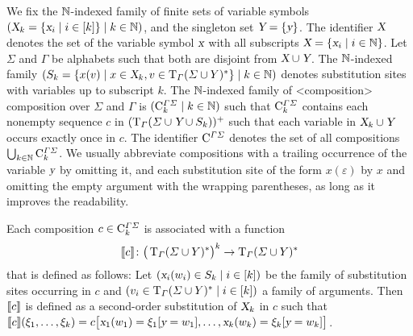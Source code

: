 \documentclass[../../document.tex]{subfiles}
\begin{document}
    \begin{definition}[Composition]
        We fix the \(\mathbb{N}\)-indexed family of finite sets of variable symbols \((\textsl{X}_k = \{\textsl{x}_i \mid i \in [k]\} \mid k \in \mathbb{N})\), and the singleton set \(\textsl{Y} = \{\textsl{y}\}\).
        The identifier \(\textsl{X}\) denotes the set of the variable symbol \(\textsl{x}\) with all subscripts \(\textsl{X} = \{\textsl{x}_i \mid i \in \mathbb{N}\}\).
        Let \(\varSigma\) and \(\varGamma\) be alphabets such that both are disjoint from \(\textsl{X} \cup \textsl{Y}\).
        The \(\mathbb{N}\)-indexed family \((S_k = \{x(v) \mid x \in \textsl{X}_k, v \in \operatorname{T}_\varGamma(\varSigma \cup Y)^*\} \mid k \in \mathbb{N})\) denotes substitution sites with variables up to subscript \(k\).
        The \(\mathbb{N}\)-indexed family of <composition>{ composition} over \(\varSigma\) and \(\varGamma\) is \((\mathrm{C}^{\varGamma\varSigma}_k \mid k \in \mathbb{N})\) such that \(\mathrm{C}^{\varGamma\varSigma}_k\) contains each nonempty sequence \(c\) in \((\operatorname{T}_\varGamma(\varSigma \cup \textsl{Y} \cup S_k))^+\) such that each variable in \(\textsl{X}_k \cup \textsl{Y}\) occurs exactly once in \(c\).
        The identifier \(\mathrm{C}^{\varGamma\varSigma}\) denotes the set of all  compositions \(\bigcup_{k \in \mathbb{N}} \mathrm{C}^{\varGamma\varSigma}_{k}\).
        We usually abbreviate compositions with a trailing occurrence of the variable \(\textsl{y}\) by omitting it, and each substitution site of the form \(x(\varepsilon)\) by \(x\) and omitting the empty argument with the wrapping parentheses, as long as it improves the readability.

        Each composition \(c \in \mathrm{C}^{\varGamma\varSigma}_k\) is associated with a function \[
            \llbracket c\rrbracket\colon \big(\operatorname{T}_\varGamma(\varSigma \cup Y)^*\big)^k \to \operatorname{T}_\varGamma(\varSigma \cup Y)^*
        \] that is defined as follows:
            Let \((\textsl{x}_i(w_i) \in S_k \mid i \in [k])\) be the family of substitution sites occurring in \(c\) and \((v_i \in \operatorname{T}_\varGamma(\varSigma \cup Y)^* \mid i \in [k])\) a family of arguments.
            Then \(\llbracket c\rrbracket\) is defined as a second-order substitution of \(\textsl{X}_k\) in \(c\) such that \(\llbracket c\rrbracket(\xi_1, \ldots, \xi_k) = c\big[\textsl{x}_1(w_1)=\xi_1[\textsl{y}=w_1], \ldots, \textsl{x}_k(w_k)=\xi_k[\textsl{y}=w_k]\big]\).
    \end{definition}

\end{document}
